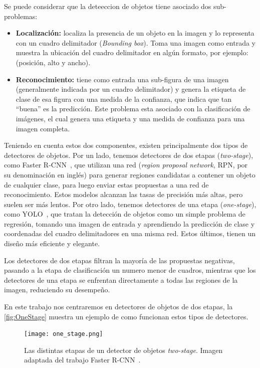 Se puede considerar que la deteeccion de objetos tiene asociado dos sub-problemas:

\begin{itemize}
	\item \textbf{Localización:} localiza la presencia de un objeto en la imagen y lo representa con un cuadro delimitador (\textit{Bounding box}). Toma una imagen como entrada y muestra la ubicación del cuadro delimitador en algún formato, por ejemplo: (posición, alto y ancho).
	\item \textbf{Reconocimiento:} tiene como entrada una sub-figura de una imagen (generalmente indicada por un cuadro delimitador) y genera la etiqueta de clase de esa figura con una medida de la confianza, que indica que tan ``buena'' es la predicción. Este problema esta asociado con la clasificación de imágenes, el cual genera una etiqueta y una medida de confianza para una imagen completa.
\end{itemize}


Teniendo en cuenta estos dos componentes, existen principalmente dos tipos de detectores de objetos. Por un lado, tenemos detectores de dos etapas (\textit{two-stage}), como Faster R-CNN~\cite{ren2015faster}, que utilizan una red (\textit{region proposal network}, RPN, por su denominación en inglés) para generar regiones candidatas a contener un objeto de cualquier clase, para luego enviar estas propuestas a una red de reconocimiento. Estos modelos alcanzan las tasas de precisión más altas, pero suelen ser más lentos. Por otro lado, tenemos detectores de una etapa (\textit{one-stage}), como YOLO~\cite{redmon2016you}, que tratan la detección de objetos como un simple problema de regresión, tomando una imagen de entrada y aprendiendo la predicción de clase y coordenadas del cuadro delimitadores en una misma red. Estos últimos, tienen un diseño más eficiente y elegante. 

Los detectores de dos etapas filtran la mayoría de las propuestas negativas, pasando a la etapa de clasificación un numero menor de cuadros, mientras que los detectores de una etapa se enfrentan directamente a todas las regiones de la imagen, reduciendo su desempeño.

En este trabajo nos centraremos en detectores de objetos de dos etapas, la \autoref{fig:OneStage} muestra un ejemplo de como funcionan estos tipos de detectores.\\

\begin{figure}
	\centering
	\texttt{[image: one\_stage.png]}
	\caption{Las distintas etapas de un detector de objetos \textit{two-stage}. Imagen adaptada del trabajo Faster R-CNN~\cite{ren2015faster}.}
	\label{fig:OneStage}
\end{figure}

